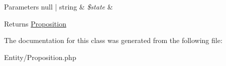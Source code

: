 \begin{DoxyParams}[1]{Parameters}
null | string & {\em \$state} & \\
\hline
\end{DoxyParams}
\begin{DoxyReturn}{Returns}
\mbox{\hyperlink{class_app_1_1_entity_1_1_proposition}{Proposition}} 
\end{DoxyReturn}


The documentation for this class was generated from the following file\+:\begin{DoxyCompactItemize}
\item 
Entity/Proposition.\+php\end{DoxyCompactItemize}
